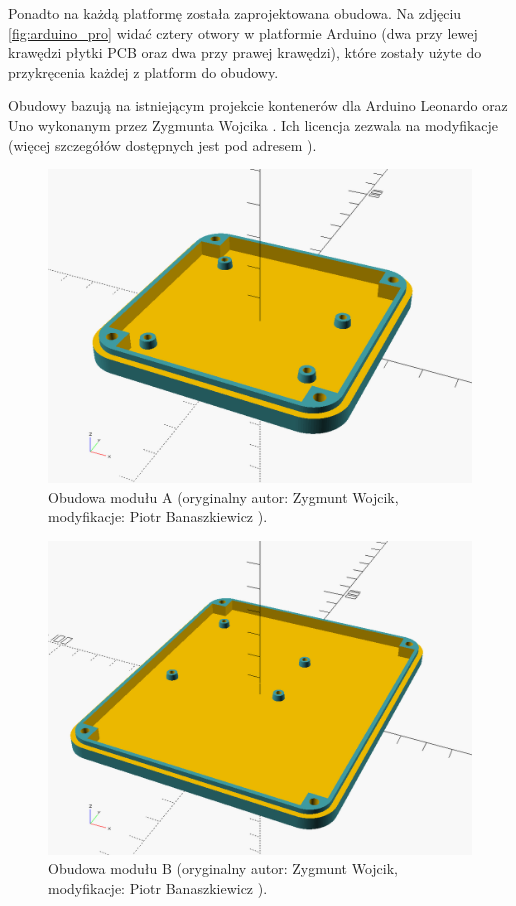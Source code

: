 Ponadto na każdą platformę została zaprojektowana obudowa. Na zdjęciu \ref{fig:arduino_pro} widać cztery otwory w platformie Arduino (dwa przy lewej krawędzi płytki PCB oraz dwa przy prawej krawędzi), które zostały użyte do przykręcenia każdej z platform do obudowy.

Obudowy bazują na istniejącym projekcie kontenerów dla Arduino Leonardo oraz Uno wykonanym przez Zygmunta Wojcika  \cite{Woj15}. Ich licencja zezwala na modyfikacje (więcej szczegółów dostępnych jest pod adresem \cite{CasesLicense}).

\begin{figure}[H]
	\centering
	\includegraphics[scale=0.3]{pics/moduleA_case.png}
	\caption{\label{fig:moduleA_case}Obudowa modułu A (oryginalny autor: Zygmunt Wojcik, modyfikacje: Piotr Banaszkiewicz \cite{CasesLicense}).}
\end{figure}

\begin{figure}[H]
	\centering
	\includegraphics[scale=0.3]{pics/moduleB_case.png}
	\caption{\label{fig:moduleB_case}Obudowa modułu B (oryginalny autor: Zygmunt Wojcik, modyfikacje: Piotr Banaszkiewicz \cite{CasesLicense}).}
\end{figure}

